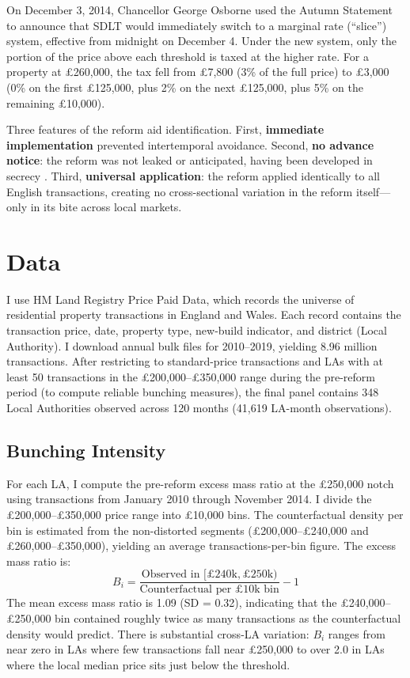 \documentclass[12pt]{article}
\begin{document}
On December 3, 2014, Chancellor George Osborne used the Autumn Statement to announce that SDLT would immediately switch to a marginal rate (``slice'') system, effective from midnight on December 4. Under the new system, only the portion of the price above each threshold is taxed at the higher rate. For a property at \pounds260,000, the tax fell from \pounds7,800 (3\% of the full price) to \pounds3,000 (0\% on the first \pounds125,000, plus 2\% on the next \pounds125,000, plus 5\% on the remaining \pounds10,000).

Three features of the reform aid identification. First, \textbf{immediate implementation} prevented intertemporal avoidance. Second, \textbf{no advance notice}: the reform was not leaked or anticipated, having been developed in secrecy \citep{johnson2014}. Third, \textbf{universal application}: the reform applied identically to all English transactions, creating no cross-sectional variation in the reform itself---only in its bite across local markets.

\section{Data}

I use HM Land Registry Price Paid Data, which records the universe of residential property transactions in England and Wales. Each record contains the transaction price, date, property type, new-build indicator, and district (Local Authority). I download annual bulk files for 2010--2019, yielding 8.96 million transactions. After restricting to standard-price transactions and LAs with at least 50 transactions in the \pounds200,000--\pounds350,000 range during the pre-reform period (to compute reliable bunching measures), the final panel contains 348 Local Authorities observed across 120 months (41,619 LA-month observations).

\subsection{Bunching Intensity}

For each LA, I compute the pre-reform excess mass ratio at the \pounds250,000 notch using transactions from January 2010 through November 2014. I divide the \pounds200,000--\pounds350,000 price range into \pounds10,000 bins. The counterfactual density per bin is estimated from the non-distorted segments (\pounds200,000--\pounds240,000 and \pounds260,000--\pounds350,000), yielding an average transactions-per-bin figure. The excess mass ratio is:
\begin{equation}
B_i = \frac{\text{Observed in } [\pounds240\text{k}, \pounds250\text{k})}{\text{Counterfactual per } \pounds10\text{k bin}} - 1
\end{equation}
The mean excess mass ratio is 1.09 (SD = 0.32), indicating that the \pounds240,000--\pounds250,000 bin contained roughly twice as many transactions as the counterfactual density would predict. There is substantial cross-LA variation: $B_i$ ranges from near zero in LAs where few transactions fall near \pounds250,000 to over 2.0 in LAs where the local median price sits just below the threshold.
\end{document}
